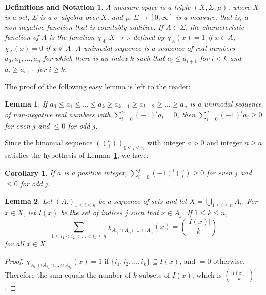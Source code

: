 \documentclass[12pt]{article}
\begin{document}
\newtheorem*{defs}{Definitions and Notation}
\newtheorem{lem}{Lemma}
\newtheorem{cor}{Corollary}
\newtheorem{thm}{Theorem}

\begin{defs}
A {\em measure space} is a triple $(X,\Sigma,\mu)$, where $X$ is a set, $\Sigma$ is a $\sigma$-algebra over $X$, and $\mu \colon \Sigma \rightarrow [0,\infty]$ is a measure, that is, a non-negative function that is countably additive.  If $A \in \Sigma$, the {\em characteristic function} of $A$ is the function $\chi_A \colon X \rightarrow \mathbb{R}$ defined by $\chi_A(x) = 1$ if $x \in A$, $\chi_A(x) = 0$ if $x \notin A$.  A {\em unimodal sequence} is a sequence of real numbers $a_0,a_1,\ldots,a_n$ for which there is an index $k$ such that $a_{i} \leq a_{i+1}$ for $i < k$ and $a_i \geq a_{i+1}$ for $i \geq k$.
\end{defs}

The proof of the following easy lemma is left to the reader:

\begin{lem}
\label{unimodal}
If $a_0 \leq a_1 \leq \ldots \leq a_k \geq a_{k+1} \geq a_{k+2} \geq \ldots \geq a_n$ is a unimodal sequence of non-negative real numbers with $\sum_{i=0}^{n} (-1)^i a_i = 0$, then $\sum_{i=0}^j (-1)^i a_i \geq 0$ for even $j$ and $\leq 0$ for odd $j$.
\end{lem}

Since the binomial sequence $(\binom{a}{i})_{0 \leq i \leq n}$ with integer $a > 0$ and integer $n \geq a$ satisfies the hypothesis of Lemma~\ref{unimodal}, we have:

\begin{cor}
\label{bincor}
If $a$ is a positive integer, $\sum_{i=0}^j (-1)^i \binom{a}{i} \geq 0$ for even $j$ and $\leq 0$ for odd $j$.
\end{cor}

\begin{lem}
\label{combinat}
Let $(A_i)_{1 \leq i \leq n}$ be a sequence of sets and let $X = \bigcup_{1 \leq i \leq n} A_i$. For $x \in X$, let $I(x)$ be the set of indices $j$ such that $x \in A_j$. If $1 \leq k \leq n$, 
\begin{equation*}
\sum_{1 \leq i_1 < i_2 < \ldots < i_k \leq n} \chi_{A_{i_1} \cap A_{i_2} \cap \ldots \cap A_{i_k}} (x) = \binom{|I(x)|}{k}
\end{equation*}
for all $x \in X$.
\end{lem}
\begin{proof}
$\chi_{A_{i_1} \cap A_{i_2} \cap \ldots \cap A_{i_k}} (x) = 1$ if $\{i_1, i_2, \ldots, i_k\} \subseteq I(x)$, and $= 0$ otherwise. Therefore the sum equals the number of $k$-subsets of $I(x)$, which is $\binom{|I(x)|}{k}$.
\end{proof}
\end{document}
